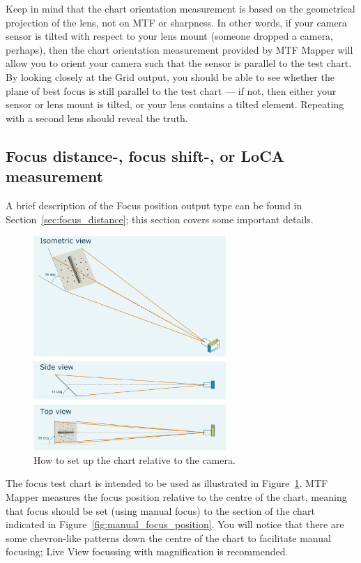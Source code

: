 \documentclass[a4paper]{article}
\begin{document}
Keep in mind that the chart orientation measurement is based on the
geometrical projection of the lens, not on MTF or sharpness. In other words,
if your camera sensor is tilted with respect to your lens mount (someone
dropped a camera, perhaps), then the chart orientation measurement provided
by MTF Mapper will allow you to orient your camera such that the sensor is
parallel to the test chart. By looking closely at the \textsf{Grid} output,
you should be able to see whether the plane of best focus is still parallel
to the test chart --- if not, then either your sensor or lens mount is
tilted, or your lens contains a tilted element. Repeating with a second lens
should reveal the truth.

\subsection{Focus distance-, focus shift-, or LoCA measurement}
\label{sec:focus_distance_details}
A brief description of the \textsf{Focus position} output type can be found in
Section~\ref{sec:focus_distance}; this section covers some important
details. 

\begin{figure}[ht!]
\centering
\includegraphics[width=0.65\textwidth]{figures/focus_chart_diagram}
\caption{How to set up the chart relative to the camera.}
\label{fig:focus_diagram}
\end{figure}

The \textsf{focus} test chart is intended to be used as illustrated in
Figure~\ref{fig:focus_diagram}. MTF Mapper measures the focus position
relative to the centre of the chart, meaning that focus should be set (using
manual focus) to the section of the chart indicated in
Figure~\ref{fig:manual_focus_position}. You will notice that there are some
chevron-like patterns down the centre of the chart to facilitate manual
focusing; Live View focussing with magnification is recommended.
\end{document}
